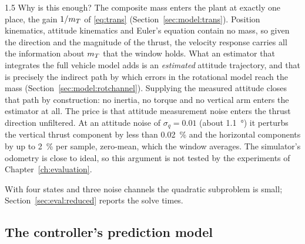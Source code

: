 \begin{spacing}{1.5}
Why is this enough? The composite mass enters the plant at exactly one place, the
gain $1/m_T$ of \eqref{eq:trans} (Section~\ref{sec:model:trans}). Position
kinematics, attitude kinematics and Euler's equation contain no mass, so given
the direction and the magnitude of the thrust, the velocity response carries all
the information about $m_T$ that the window holds. What an estimator that
integrates the full vehicle model adds is an \emph{estimated} attitude
trajectory, and that is precisely the indirect path by which errors in the
rotational model reach the mass (Section~\ref{sec:model:rotchannel}). Supplying
the measured attitude closes that path by construction: no inertia, no torque and
no vertical arm enters the estimator at all. The price is that attitude
measurement noise enters the thrust direction unfiltered. At an attitude noise of
$\sigma_q=0.01$ (about \SI{1.1}{\degree}) it perturbs
the vertical thrust component by less than \SI{0.02}{\percent} and the horizontal
components by up to \SI{2}{\percent} per sample, zero-mean, which the window
averages. The simulator's odometry is close to ideal, so this argument is not
tested by the experiments of Chapter~\ref{ch:evaluation}.

With four states and three noise channels the quadratic subproblem is small;
Section~\ref{sec:eval:reduced} reports the solve times.

\subsection{The controller's prediction model}\label{sec:model:ctrl}


\end{spacing}

